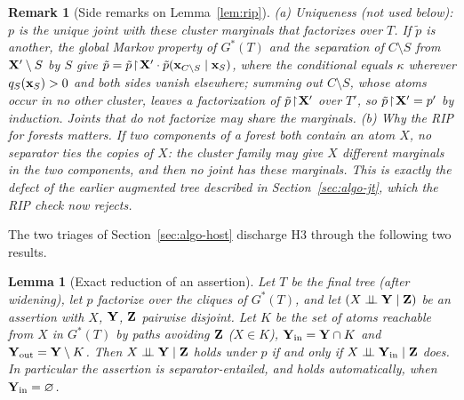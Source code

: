 \documentclass{article} %
\newtheorem{lemma}{Lemma}
\newtheorem{remark}{Remark}
\newcommand{\indep}{\perp\!\!\!\perp}
\newcommand{\restr}{\!\restriction\!}
\begin{document}
\begin{remark}[Side remarks on Lemma~\ref{lem:rip}]
(a) \emph{Uniqueness} (not used below): $p$ is the unique joint with these cluster
marginals that factorizes over $T$. If $\tilde p$ is another, the global Markov
property of $G^\ast(T)$ \citep[Prop.~3.8]{lauritzen96} and the separation of
$C\setminus S$ from $\mathbf{X}'\setminus S$ by $S$ give
$\tilde p=\tilde p\restr{\bX'}\cdot\tilde p(\bx_{C\setminus S}\mid \bx_S)$, where the
conditional equals $\kappa$ wherever $q_S(\mathbf{x}_S)>0$ and both sides vanish
elsewhere; summing out $C\setminus S$, whose atoms occur in no other cluster, leaves
a factorization of $\tilde p\restr{\bX'}$ over $T'$, so $\tilde p\restr{\bX'}=p'$ by
induction. Joints that do not factorize may share the marginals.
(b) \emph{Why the RIP for forests matters.} If two components of a forest both
contain an atom $X$, no separator ties the copies of $X$: the cluster family may
give $X$ different marginals in the two components, and then no joint has these
marginals. This is exactly the defect of the earlier augmented tree described in
Section~\ref{sec:algo-jt}, which the RIP check now rejects.
\end{remark}

The two triages of Section~\ref{sec:algo-host} discharge H3 through the
following two results.

\begin{lemma}[Exact reduction of an assertion]\label{lem:reduce}
Let $T$ be the final tree (after widening), let $p$ factorize over the cliques of
$G^\ast(T)$, and let $(X\indep \bY\mid \bZ)$ be an assertion with $X$, $\mathbf{Y}$, $\mathbf{Z}$
pairwise disjoint. Let $K$ be the set of atoms reachable from $X$ in $G^\ast(T)$ by
paths avoiding $\mathbf{Z}$ ($X\in K$), $\mathbf{Y}_{\mathrm{in}}=\mathbf{Y}\cap K$ and
$\mathbf{Y}_{\mathrm{out}}=\mathbf{Y}\setminus K$. Then $X\indep \bY\mid \bZ$ holds under $p$ if and only if
$X\indep \bY_{\mathrm{in}}\mid \bZ$ does. In particular the assertion is
separator-entailed, and holds automatically, when $\mathbf{Y}_{\mathrm{in}}=\varnothing$.
\end{lemma}
\end{document}
